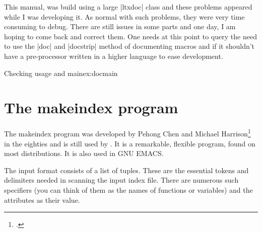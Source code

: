 This manual, was build using a large |ltxdoc| class and these problems appeared while I was developing it. As normal with such problems, they were very time consuming to debug. There are still issues in some parts and one day, I am hoping to come back and correct them. One needs at this point to query the need to use the |doc| and |docstrip| method of documenting macros and if it shouldn't have a pre-processor written in a higher language to ease development. 

\begin{texexample}{Checking usage and main}{ex:docmain}
\meaning\main \\
\meaning\usage
\end{texexample}



\long{}
\chapter{The makeindex program}

The makeindex program was developed by Pehong Chen and Michael Harrison\footcite{chen01} in the eighties and is still used by \latexe. It is a remarkable, flexible program, found on most distributions. It is also used in GNU EMACS. 

The input format consists of a list of  tuples. These are the essential tokens and delimiters needed in scanning the input index file. There are numerous such specifiers (you can think of them as the names of functions or variables) and the attributes as their value. 

